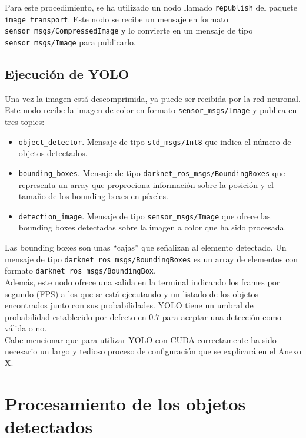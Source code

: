 Para este procedimiento, se ha utilizado un nodo llamado \texttt{republish} del paquete \texttt{image\_transport}. Este nodo se recibe un mensaje en formato \texttt{sensor\_msgs/\-Compressed\-Image} y lo convierte en un mensaje de tipo \texttt{sensor\_msgs/Image} para publicarlo.\\

\subsection{Ejecución de YOLO}

Una vez la imagen está descomprimida, ya puede ser recibida por la red neuronal. Este nodo recibe la imagen de color en formato \texttt{sensor\_msgs/Image} y publica en tres topics:

\begin{itemize}

	\item \texttt{object\_detector}. Mensaje de tipo \texttt{std\_msgs/Int8} que indica el número de objetos detectados.
	\item \texttt{bounding\_boxes}. Mensaje de tipo \texttt{darknet\_ros\_msgs/BoundingBoxes} que representa un array que proprociona información sobre la posición y el tamaño de los bounding boxes en píxeles.
	\item \texttt{detection\_image}. Mensaje de tipo \texttt{sensor\_msgs/Image} que ofrece las bounding boxes detectadas sobre la imagen a color que ha sido procesada.
	
\end{itemize}

Las bounding boxes son unas ``cajas'' que señalizan al elemento detectado. Un mensaje de tipo \texttt{darknet\_ros\_msgs/BoundingBoxes} es un array de elementos con formato \texttt{darknet\_ros\_msgs/BoundingBox}.\\

Además, este nodo ofrece una salida en la terminal indicando los frames por segundo (FPS) a los que se está ejecutando y un listado de los objetos encontrados junto con sus probabilidades. YOLO tiene un umbral de probabilidad establecido por defecto en $0.7$ para aceptar una detección como válida o no. \\

Cabe mencionar que para utilizar YOLO con CUDA correctamente ha sido necesario un largo y tedioso proceso de configuración que se explicará en el Anexo X.\\

\section{Procesamiento de los objetos detectados}

